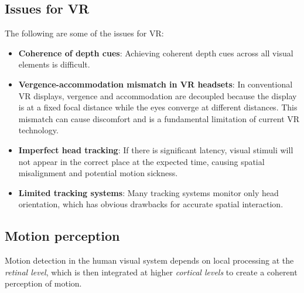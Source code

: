 \documentclass[11pt,a4paper]{article}
\theoremstyle{definition}
\theoremstyle{plain}
\theoremstyle{remark}
\begin{document}
\subsection{Issues for VR}
The following are some of the issues for VR:
\begin{itemize}
    \item \textbf{Coherence of depth cues}: Achieving coherent depth cues across all visual elements is difficult.
    \item \textbf{Vergence-accommodation mismatch in VR headsets}: In conventional VR displays, vergence and accommodation are decoupled because the display is at a fixed focal distance while the eyes converge at different distances. This mismatch can cause discomfort and is a fundamental limitation of current VR technology.
    \item \textbf{Imperfect head tracking}: If there is significant latency, visual stimuli will not appear in the correct place at the expected time, causing spatial misalignment and potential motion sickness.
    \item \textbf{Limited tracking systems}: Many tracking systems monitor only head orientation, which has obvious drawbacks for accurate spatial interaction.

\end{itemize}


\subsection{Motion perception}
Motion detection in the human visual system depends on local processing at the \textit{retinal level}, which is then integrated at higher \textit{cortical levels} to create a coherent perception of motion.
\end{document}
